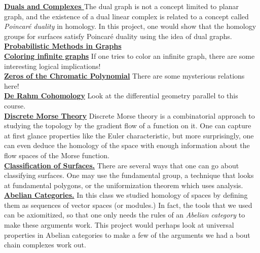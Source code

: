 \noindent \textbf{\hyperref[proj:dualsandhomology]{ Duals and Complexes }} The dual graph is not a concept limited to planar graph, and the existence of a dual linear complex is related to a concept called \emph{Poincar\'e duality} in homology. In this project, one would show that the homology groups for surfaces satisfy Poincar\'e duality using the idea of dual graphs. \\

\noindent \textbf{\hyperref[proj:probmethod]{ Probabilistic Methods in Graphs }}\\


\noindent \textbf{\hyperref[proj:hadwigernelson]{Coloring infinite graphs} } If one tries to color an infinite graph, there are some interesting logical implications! \\

\noindent \textbf{\hyperref[proj:chromatic]{ Zeros of the Chromatic Polynomial} } There are some mysterious relations here! \\

\noindent \textbf{\hyperref[proj:derham]{ De Rahm Cohomology} } Look at the differential geometry parallel to this course. \\

\noindent \textbf{\hyperref[proj:morsetheory]{ Discrete Morse Theory} } Discrete Morse theory is a combinatorial approach to studying the topology by the gradient flow of a function on it. One can capture at first glance properties like the Euler characteristic, but more surprisingly, one can even deduce the homology of the space with enough information about the flow spaces of the Morse function. \\

\noindent \textbf{\hyperref[proj:classification] {Classification of Surfaces.} } There are several ways that one can go about classifying surfaces. One may use the fundamental group, a technique that looks at fundamental polygons, or the uniformization theorem which uses analysis. \\


\noindent \textbf{\hyperref[proj:Abelian] {Abelian Categories.} } In this class we studied homology of spaces by defining them as sequences of vector spaces (or modules.) In fact, the tools that we used can be axiomitized, so that one only needs the rules of an \emph{Abelian category} to make these arguments work. This project would perhaps look at universal properties in Abelian categories to make a few of the arguments we had a bout chain complexes work out. \\


